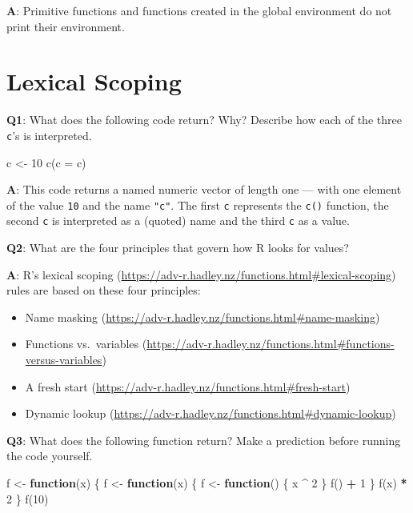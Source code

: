 \documentclass[
]{krantz}
\makeatletter
\newenvironment{Shaded}{\begin{snugshade}}{\end{snugshade}}
\newcommand{\ControlFlowTok}[1]{\textcolor[rgb]{0.13,0.29,0.53}{\textbf{#1}}}
\newcommand{\DataTypeTok}[1]{\textcolor[rgb]{0.13,0.29,0.53}{#1}}
\newcommand{\DecValTok}[1]{\textcolor[rgb]{0.00,0.00,0.81}{#1}}
\newcommand{\KeywordTok}[1]{\textcolor[rgb]{0.13,0.29,0.53}{\textbf{#1}}}
\newcommand{\NormalTok}[1]{#1}
\newcommand{\OperatorTok}[1]{\textcolor[rgb]{0.81,0.36,0.00}{\textbf{#1}}}
\newcommand{\StringTok}[1]{\textcolor[rgb]{0.31,0.60,0.02}{#1}}
\providecommand{\tightlist}{%
  \setlength{\itemsep}{0pt}\setlength{\parskip}{0pt}}
\renewcommand{\href}[2]{#2 (\url{#1})}
\newenvironment{kframe}{%
\medskip{}
\setlength{\fboxsep}{.8em}
 \def\at@end@of@kframe{}%
 \ifinner\ifhmode%
  \def\at@end@of@kframe{\end{minipage}}%
  \begin{minipage}{\columnwidth}%
 \fi\fi%
 \def\FrameCommand##1{\hskip\@totalleftmargin \hskip-\fboxsep
 \colorbox{shadecolor}{##1}\hskip-\fboxsep
     \hskip-\linewidth \hskip-\@totalleftmargin \hskip\columnwidth}%
 \MakeFramed {\advance\hsize-\width
   \@totalleftmargin\z@ \linewidth\hsize
   \@setminipage}}%
 {\par\unskip\endMakeFramed%
 \at@end@of@kframe}
\renewenvironment{Shaded}{\begin{kframe}}{\end{kframe}}
\renewcommand{\KeywordTok} [1]{\textcolor[rgb]{0.00,0.44,0.13}{{#1}}}
\renewcommand{\DataTypeTok}[1]{\textcolor[rgb]{0.56,0.13,0.00}{{#1}}}
\renewcommand{\DecValTok}  [1]{\textcolor[rgb]{0.25,0.63,0.44}{{#1}}}
\renewcommand{\StringTok}  [1]{\textcolor[rgb]{0.25,0.44,0.63}{{#1}}}
\renewcommand{\NormalTok}  [1]{{#1}}
\makeatother
\begin{document}
\textbf{{A}}: Primitive functions and functions created in the global environment do not print their environment.


\hypertarget{lexical-scoping}{%
\section{Lexical Scoping}\label{lexical-scoping}}

\textbf{{Q1}}: What does the following code return? Why? Describe how each of the three \texttt{c}'s is interpreted.

\begin{Shaded}
\begin{Highlighting}[]
\NormalTok{c <-}\StringTok{ }\DecValTok{10}
\KeywordTok{c}\NormalTok{(}\DataTypeTok{c =}\NormalTok{ c)}
\end{Highlighting}
\end{Shaded}

\textbf{{A}}: This code returns a named numeric vector of length one --- with one element of the value \texttt{10} and the name \texttt{"c"}. The first \texttt{c} represents the \texttt{c()} function, the second \texttt{c} is interpreted as a (quoted) name and the third \texttt{c} as a value.

\textbf{{Q2}}: What are the four principles that govern how R looks for values?

\textbf{{A}}: R's \href{https://adv-r.hadley.nz/functions.html\#lexical-scoping}{lexical scoping} rules are based on these four principles:

\begin{itemize}
\tightlist
\item
  \href{https://adv-r.hadley.nz/functions.html\#name-masking}{Name masking}
\item
  \href{https://adv-r.hadley.nz/functions.html\#functions-versus-variables}{Functions vs.~variables}
\item
  \href{https://adv-r.hadley.nz/functions.html\#fresh-start}{A fresh start}
\item
  \href{https://adv-r.hadley.nz/functions.html\#dynamic-lookup}{Dynamic lookup}
\end{itemize}

\textbf{{Q3}}: What does the following function return? Make a prediction before running the code yourself.

\begin{Shaded}
\begin{Highlighting}[]
\NormalTok{f <-}\StringTok{ }\ControlFlowTok{function}\NormalTok{(x) \{}
\NormalTok{  f <-}\StringTok{ }\ControlFlowTok{function}\NormalTok{(x) \{}
\NormalTok{    f <-}\StringTok{ }\ControlFlowTok{function}\NormalTok{() \{}
\NormalTok{      x }\OperatorTok{^}\StringTok{ }\DecValTok{2}
\NormalTok{    \}}
    \KeywordTok{f}\NormalTok{() }\OperatorTok{+}\StringTok{ }\DecValTok{1}
\NormalTok{  \}}
  \KeywordTok{f}\NormalTok{(x) }\OperatorTok{*}\StringTok{ }\DecValTok{2}
\NormalTok{\}}
\KeywordTok{f}\NormalTok{(}\DecValTok{10}\NormalTok{)}
\end{Highlighting}
\end{Shaded}
\end{document}
